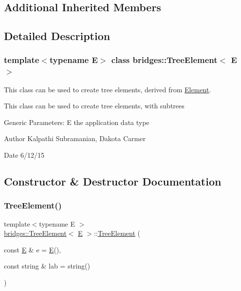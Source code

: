 \subsection*{Additional Inherited Members}


\subsection{Detailed Description}
\subsubsection*{template$<$typename E$>$\newline
class bridges\+::\+Tree\+Element$<$ E $>$}

This class can be used to create tree elements, derived from \mbox{\hyperlink{classbridges_1_1_element}{Element}}. 

This class can be used to create tree elements, with subtrees

Generic Parameters\+: E the application data type

\begin{DoxyAuthor}{Author}
Kalpathi Subramanian, Dakota Carmer 
\end{DoxyAuthor}
\begin{DoxyDate}{Date}
6/12/15 
\end{DoxyDate}


\subsection{Constructor \& Destructor Documentation}
\mbox{\label{classbridges_1_1_tree_element_a4e96ffab9a6c711ead687dd8a42e80a0}} 
\subsubsection{\texorpdfstring{TreeElement()}{TreeElement()}}
{\footnotesize\ttfamily template$<$typename E $>$ \\
\mbox{\hyperlink{classbridges_1_1_tree_element}{bridges\+::\+Tree\+Element}}$<$ \mbox{\hyperlink{namespacebridges_acfb0a4f7877d8f63de3e6862004c50eda3a3ea00cfc35332cedf6e5e9a32e94da}{E}} $>$\+::\mbox{\hyperlink{classbridges_1_1_tree_element}{Tree\+Element}} (\begin{DoxyParamCaption}\item[{const \mbox{\hyperlink{namespacebridges_acfb0a4f7877d8f63de3e6862004c50eda3a3ea00cfc35332cedf6e5e9a32e94da}{E}} \&}]{e = {\ttfamily \mbox{\hyperlink{namespacebridges_acfb0a4f7877d8f63de3e6862004c50eda3a3ea00cfc35332cedf6e5e9a32e94da}{E}}()},  }\item[{const string \&}]{lab = {\ttfamily string()} }\end{DoxyParamCaption})\hspace{0.3cm}{\ttfamily [inline]}}


